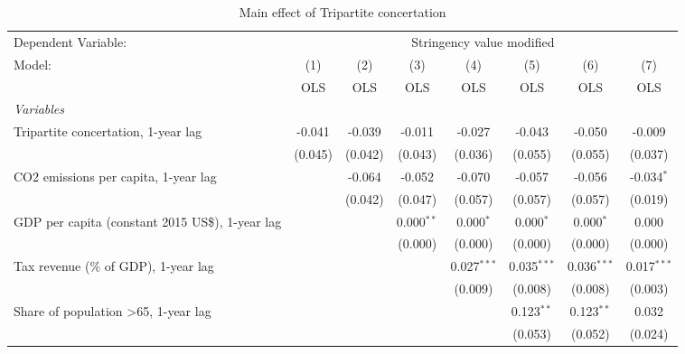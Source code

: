 
\begin{table}[htbp]
   \caption{Main effect of Tripartite concertation}
   \centering
   \begin{tabular}{lccccccc}
      \toprule
      Dependent Variable: & \multicolumn{7}{c}{Stringency value modified}\\
      Model:                                                & (1)     & (2)     & (3)          & (4)           & (5)           & (6)           & (7)\\  
                                                            &  OLS    & OLS     & OLS          & OLS           & OLS           & OLS           & OLS\\  
      \midrule
      \emph{Variables}\\
      Tripartite concertation, 1-year lag                   & -0.041  & -0.039  & -0.011       & -0.027        & -0.043        & -0.050        & -0.009\\   
                                                            & (0.045) & (0.042) & (0.043)      & (0.036)       & (0.055)       & (0.055)       & (0.037)\\   
      CO2 emissions per capita, 1-year lag                  &         & -0.064  & -0.052       & -0.070        & -0.057        & -0.056        & -0.034$^{*}$\\   
                                                            &         & (0.042) & (0.047)      & (0.057)       & (0.057)       & (0.057)       & (0.019)\\   
      GDP per capita (constant 2015 US\$), 1-year lag       &         &         & 0.000$^{**}$ & 0.000$^{*}$   & 0.000$^{*}$   & 0.000$^{*}$   & 0.000\\   
                                                            &         &         & (0.000)      & (0.000)       & (0.000)       & (0.000)       & (0.000)\\   
      Tax revenue (\% of GDP), 1-year lag                   &         &         &              & 0.027$^{***}$ & 0.035$^{***}$ & 0.036$^{***}$ & 0.017$^{***}$\\   
                                                            &         &         &              & (0.009)       & (0.008)       & (0.008)       & (0.003)\\   
      Share of population >65, 1-year lag                   &         &         &              &               & 0.123$^{**}$  & 0.123$^{**}$  & 0.032\\   
                                                            &         &         &              &               & (0.053)       & (0.052)       & (0.024)\\   

\end{tabular}
\end{table}
